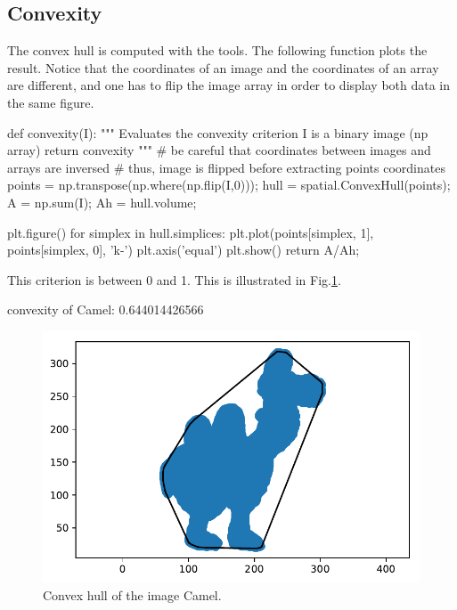 \subsection{Convexity}
The convex hull is computed with the  tools. The following function plots the result. Notice that the coordinates of an image and the coordinates of an array are different, and one has to flip the image array in order to display both data in the same figure.
\begin{python}
def convexity(I):
    """
    Evaluates the convexity criterion
    I is a binary image (np array)
    return convexity
    """
    # be careful that coordinates between images and arrays are inversed
    # thus, image is flipped before extracting points coordinates
    points = np.transpose(np.where(np.flip(I,0)));
    hull = spatial.ConvexHull(points);
    A = np.sum(I);
    Ah = hull.volume;
    
    plt.figure()
    for simplex in hull.simplices:
        plt.plot(points[simplex, 1], points[simplex, 0], 'k-')
    plt.axis('equal')
    plt.show()
    return A/Ah;
\end{python}
This criterion is between 0 and 1. This is illustrated in Fig.\ref{fig:tutorial:characterization:python:convhull}.
\begin{sh}
convexity of Camel:  0.644014426566
\end{sh}

\begin{figure}
 \centering
 \includegraphics[width=.6\linewidth]{convhull.pdf}
 \caption{Convex hull of the image Camel.}
 \label{fig:tutorial:characterization:python:convhull}
\end{figure}


